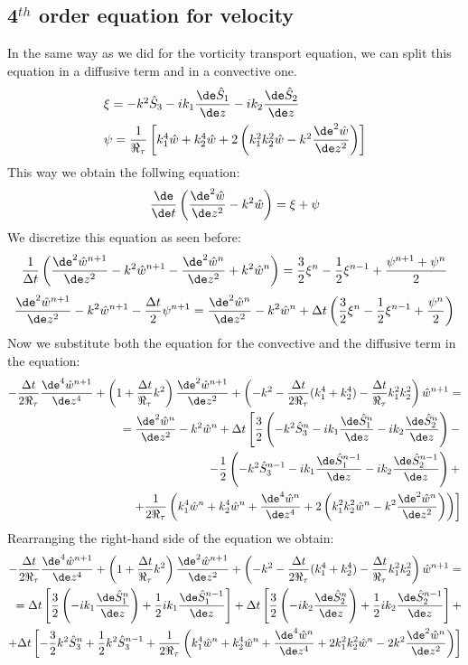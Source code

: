 \subsection{4$^{th}$ order equation for velocity}
In the same way as we did for the vorticity transport equation, we can split this equation in a diffusive term and in a convective one.
\[
\begin{array}{l}
\xi=-k^2 \hat S_3 -ik_1\dfrac{\de\hat S_1}{\de z}-ik_2\dfrac{\de\hat S_2}{\de z} \\[2ex]
\psi=\dfrac{1}{\Re_\tau}\left[ k_1^4\hat w +k_2^4\hat w+2\left(k_1^2k_2^2\hat w-k^2\dfrac{\de^2 \hat w}{\de z^2}  \right) \right]
\end{array}
\]
This way we obtain the follwing equation:
\[
\frac{\de}{\de t}\left(\frac{\de^2\hat w}{\de z^2}-k^2\hat w\right)=\xi+\psi
\]
We discretize this equation as seen before:
\[
\frac{1}{\Delta t}\left(\frac{\de^2\hat w^{n+1}}{\de z^2}-k^2\hat w^{n+1}-\frac{\de^2\hat w^n}{\de z^2}+k^2\hat w^n\right)=\frac 3 2 \xi^n-\frac 1 2 \xi^{n-1}+\frac{\psi^{n+1}+\psi^n}{2}
\]
\[
\frac{\de^2\hat w^{n+1}}{\de z^2}-k^2\hat w^{n+1}-\frac{\Delta t}{2}\psi^{n+1}=\frac{\de^2\hat w^n}{\de z^2}-k^2\hat w^n+\Delta t\left( \frac 3 2 \xi^n-\frac 1 2 \xi^{n-1}+\frac{\psi^n}{2}\right)
\]
Now we substitute both the equation for the convective and the diffusive term in the equation:
\[
\begin{split}
-\frac{\Delta t}{2\Re_\tau}\frac{\de^4\hat w^{n+1}}{\de z^4}+\left(1+\frac{\Delta t}{\Re_\tau}k^2 \right)\frac{\de^2 \hat w^{n+1}}{\de z^2}+ \left(-k^2-\frac{\Delta t}{2\Re_\tau}(k_1^4+k_2^4)-\frac{\Delta t}{\Re_\tau}k_1^2k_2^2  \right)\hat w^{n+1}=\\
=\frac{\de^2 \hat w^n}{\de z^2}-k^2\hat w^n+\Delta t \left[ \frac 32 \left(-k^2\hat S_3^{n}-ik_1\frac{\de \hat S_1^{n}}{\de z}-ik_2\frac{\de \hat S_2^{n}}{\de z}  \right)- \right .\\
\left.  -\frac 1 2 \left(-k^2\hat S_3^{n-1}-ik_1\frac{\de \hat S_1^{n-1}}{\de z}-ik_2\frac{\de \hat S_2^{n-1}}{\de z}  \right)+\right . \\
\left.+\frac{1}{2\Re_\tau}\left(k_1^4\hat w^n+k_2^4\hat w^n+\frac{\de^4\hat w^n}{\de z^4}+2\left( k_1^2k_2^2\hat w^n -k^2\frac{\de^2 \hat w^n}{\de z^2} \right)  \right)  \right]
\end{split}
\]
Rearranging the right-hand side of the equation we obtain:
\[
\begin{split}
-\frac{\Delta t}{2\Re_\tau}\frac{\de^4\hat w^{n+1}}{\de z^4}+\left(1+\frac{\Delta t}{\Re_\tau}k^2 \right)\frac{\de^2 \hat w^{n+1}}{\de z^2}+ \left(-k^2-\frac{\Delta t}{2\Re_\tau}(k_1^4+k_2^4)-\frac{\Delta t}{\Re_\tau}k_1^2k_2^2  \right)\hat w^{n+1}=\\
=\Delta t \left[\frac 32 \left(-ik_1\frac{\de \hat S_1^n}{\de z}\right)+\frac1 2 ik_1\frac{\de \hat S_1^{n-1}}{\de z} \right] +\Delta t \left[\frac 32 \left(-ik_2\frac{\de \hat S_2^n}{\de z}\right)+\frac1 2 ik_2\frac{\de \hat S_2^{n-1}}{\de z} \right]+\\
+\Delta t \left[ -\frac 32 k^2\hat S_3^n+\frac 1 2 k^2 \hat S_3^{n-1}+ \frac{1}{2\Re_\tau}\left(k_1^4\hat w^n+k_2^4\hat w^n+\frac{\de^4\hat w^n}{\de z^4}+2 k_1^2k_2^2\hat w^n -2k^2\frac{\de^2 \hat w^n}{\de z^2}  \right)  \right]
\end{split}
\]
